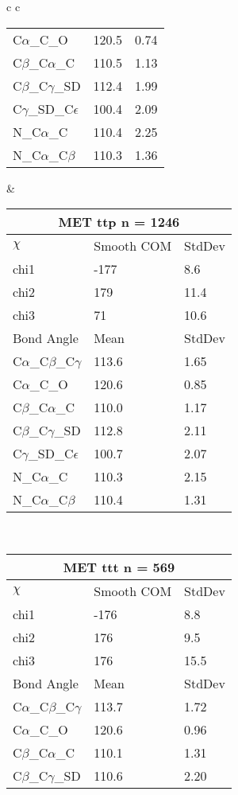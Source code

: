 \begin{longtable}{ c c }
\begin{tabular}{ l l l }
  C$\alpha$\_C\_O & 120.5 & 0.74\\
  C$\beta$\_C$\alpha$\_C & 110.5 & 1.13\\
  C$\beta$\_C$\gamma$\_SD & 112.4 & 1.99\\
  C$\gamma$\_SD\_C$\epsilon$ & 100.4 & 2.09\\
  N\_C$\alpha$\_C & 110.4 & 2.25\\
  N\_C$\alpha$\_C$\beta$ & 110.3 & 1.36\\
  \bottomrule
  \end{tabular}
  &
  \begin{tabular}{ l l l }
  \toprule
  \multicolumn{3}{c}{MET \textbf{ttp} n = 1246} \\ \toprule
  $\chi$       & Smooth COM & StdDev \\ \midrule
  chi1 & -177 & 8.6 \\ 
  chi2 & 179 & 11.4 \\ 
  chi3 & 71 & 10.6 \\ \midrule
  Bond Angle   & Mean     & StdDev \\ \midrule
  C$\alpha$\_C$\beta$\_C$\gamma$ & 113.6 & 1.65\\
  C$\alpha$\_C\_O & 120.6 & 0.85\\
  C$\beta$\_C$\alpha$\_C & 110.0 & 1.17\\
  C$\beta$\_C$\gamma$\_SD & 112.8 & 2.11\\
  C$\gamma$\_SD\_C$\epsilon$ & 100.7 & 2.07\\
  N\_C$\alpha$\_C & 110.3 & 2.15\\
  N\_C$\alpha$\_C$\beta$ & 110.4 & 1.31\\
  \bottomrule
  \end{tabular}
  \\
  \begin{tabular}{ l l l }
  \toprule
  \multicolumn{3}{c}{MET \textbf{ttt} n = 569} \\ \toprule
  $\chi$       & Smooth COM & StdDev \\ \midrule
  chi1 & -176 & 8.8 \\ 
  chi2 & 176 & 9.5 \\ 
  chi3 & 176 & 15.5 \\ \midrule
  Bond Angle   & Mean     & StdDev \\ \midrule
  C$\alpha$\_C$\beta$\_C$\gamma$ & 113.7 & 1.72\\
  C$\alpha$\_C\_O & 120.6 & 0.96\\
  C$\beta$\_C$\alpha$\_C & 110.1 & 1.31\\
  C$\beta$\_C$\gamma$\_SD & 110.6 & 2.20\\

\end{tabular}
\end{longtable}
